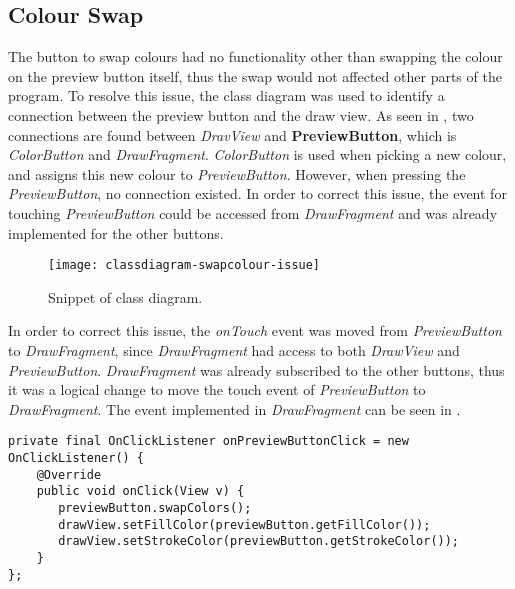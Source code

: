 \subsection{Colour Swap}
The button to swap colours had no functionality other than swapping the colour on the preview button itself, thus the swap would not affected other parts of the program.
To resolve this issue, the class diagram was used to identify a connection between the preview button and the draw view.
As seen in , two connections are found between \textit{DravView} and \textbf{PreviewButton}, which is \textit{ColorButton} and \textit{DrawFragment}.
\textit{ColorButton} is used when picking a new colour, and assigns this new colour to \textit{PreviewButton}.
However, when pressing the \textit{PreviewButton}, no connection existed.
In order to correct this issue, the event for touching \textit{PreviewButton} could be accessed from \textit{DrawFragment} and was already implemented for the other buttons. 

\begin{figure}
     \texttt{[image: classdiagram-swapcolour-issue]}
     \caption{Snippet of class diagram.}
     \label{fig:clsdiagramsnippet}
\end{figure}

In order to correct this issue, the \textit{onTouch} event was moved from \textit{PreviewButton} to \textit{DrawFragment}, since \textit{DrawFragment} had access to both \textit{DrawView} and \textit{PreviewButton}.
\textit{DrawFragment} was already subscribed to the other buttons, thus it was a logical change to move the touch event of \textit{PreviewButton} to \textit{DrawFragment}.
The event implemented in \textit{DrawFragment} can be seen in .

\begin{lstlisting}[caption={onPreviewButtonClick event},label=lst:event-previewbuttonclick]
private final OnClickListener onPreviewButtonClick = new OnClickListener() {
    @Override
    public void onClick(View v) {
       previewButton.swapColors();
       drawView.setFillColor(previewButton.getFillColor());
       drawView.setStrokeColor(previewButton.getStrokeColor());
    }
};
\end{lstlisting}